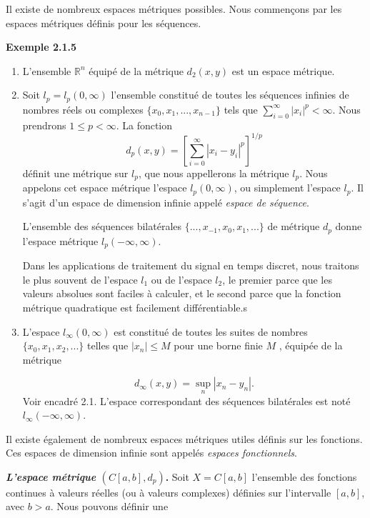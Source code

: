 \documentclass[10pt,twoside,a4paper]{book}
\begin{document}
\noindent
Il existe de nombreux espaces métriques possibles. Nous commençons par les espaces métriques définis pour les séquences.

\vspace{4mm}
\noindent
\textbf{Exemple 2.1.5}
\begin{enumerate}
  \item L'ensemble $\mathbb{R}^n$ équipé de la métrique $d_2(x, y)$ est un espace métrique.
  \item Soit $l_p = l_p(0, \infty)$ l'ensemble constitué de toutes les séquences infinies de nombres réels ou complexes $\{x_0, x_1,...,x_{n-1}\}$ tels que
  $\sum_{i=0}^{\infty} |x_i|^p < \infty$. Nous prendrons $1 \leq p < \infty$. La fonction
  \begin{equation*}
    d_p(x, y) = \left[{\sum_{i=0}^{\infty} |x_i - y_i|^p}\right]^{1/p}
  \end{equation*}
  \noindent
  définit une métrique sur $l_p$, que nous appellerons la métrique $l_p$. Nous appelons cet espace métrique l'espace $l_p(0, \infty)$, ou simplement l'espace $l_p$. 
  Il s'agit d'un espace de dimension infinie appelé \textit{espace de séquence}.

  L'ensemble des séquences bilatérales $\{...,x_{-1}, x_0, x_1,...\}$ de métrique $d_p$ donne l'espace métrique $l_p(-\infty, \infty)$.

  Dans les applications de traitement du signal en temps discret, nous traitons le plus souvent de l'espace $l_1$ ou de l'espace $l_2$, le premier parce que les valeurs absolues sont faciles à calculer, et le second parce que la fonction métrique quadratique est facilement différentiable.s
  \item L'espace $l_\infty(0, \infty)$ est constitué de toutes les suites de nombres $\{x_0, x_1, x_2,...\}$ telles que $|x_n| \leq M$ pour une borne finie $M$ , équipée de la métrique
  
  \begin{equation}
    d_\infty(x, y) = \sup\limits_n |x_n - y_n| .
  \end{equation}
  \noindent
  Voir encadré 2.1. L'espace correspondant des séquences bilatérales est noté $l_\infty(-\infty, \infty)$.
\end{enumerate}

\vspace{4mm}
Il existe également de nombreux espaces métriques utiles définis sur les fonctions. Ces espaces de dimension infinie sont appelés \textit{espaces fonctionnels}.

\vspace{4mm}
\noindent
\textbf{\textit{L'espace métrique} $(C[a, b], d_p)$.} Soit $X = C[a, b]$ l'ensemble des fonctions continues à valeurs réelles (ou à valeurs complexes) définies sur l'intervalle $[a, b]$, avec $b > a$. Nous pouvons définir une
\end{document}
